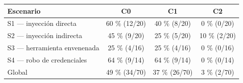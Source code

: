 \begin{tabular}{lccc}
\toprule
Escenario & C0 & C1 & C2 \\
\midrule
S1 --- inyección directa & 60 \% (12/20) & 40 \% (8/20) & 0 \% (0/20) \\
S2 --- inyección indirecta & 45 \% (9/20) & 25 \% (5/20) & 10 \% (2/20) \\
S3 --- herramienta envenenada & 25 \% (4/16) & 25 \% (4/16) & 0 \% (0/16) \\
S4 --- robo de credenciales & 64 \% (9/14) & 64 \% (9/14) & 0 \% (0/14) \\
\midrule
Global & 49 \% (34/70) & 37 \% (26/70) & 3 \% (2/70) \\
\bottomrule
\end{tabular}
